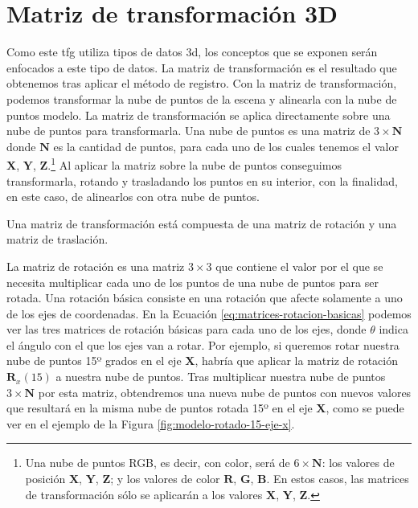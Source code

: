 \section{Matriz de transformación 3D}

Como este \gls{tfg} utiliza tipos de datos \gls{3d}, los conceptos que se exponen serán enfocados a este tipo de datos.
La matriz de transformación \citep{wiki:transformation-matrix} es el resultado que obtenemos tras aplicar el método de registro.
Con la matriz de transformación, podemos transformar la nube de puntos de la escena y alinearla con la nube de puntos modelo.
La matriz de transformación se aplica directamente sobre una nube de puntos para transformarla.
Una nube de puntos es una matriz de $3\times\mathbf{N}$ donde $\mathbf{N}$ es la cantidad de puntos, para cada uno de los cuales tenemos el valor $\mathbf{X}$, $\mathbf{Y}$, $\mathbf{Z}$.\footnote{Una nube de puntos RGB, es decir, con color, será de $6\times\mathbf{N}$: los valores de posición $\mathbf{X}$, $\mathbf{Y}$, $\mathbf{Z}$; y los valores de color $\mathbf{R}$, $\mathbf{G}$, $\mathbf{B}$.
En estos casos, las matrices de transformación sólo se aplicarán a los valores $\mathbf{X}$, $\mathbf{Y}$, $\mathbf{Z}$.}
Al aplicar la matriz sobre la nube de puntos conseguimos transformarla, rotando y trasladando los puntos en su interior, con la finalidad, en este caso, de alinearlos con otra nube de puntos.

Una matriz de transformación está compuesta de una matriz de rotación y una matriz de traslación.

La matriz de rotación \citep{wiki:rotation-matrix} es una matriz $3\times3$ que contiene el valor por el que se necesita multiplicar cada uno de los puntos de una nube de puntos para ser rotada.
Una rotación básica consiste en una rotación que afecte solamente a uno de los ejes de coordenadas.
En la Ecuación \ref{eq:matrices-rotacion-basicas} podemos ver las tres matrices de rotación básicas para cada uno de los ejes, donde $\theta$ indica el ángulo con el que los ejes van a rotar.
Por ejemplo, si queremos rotar nuestra nube de puntos 15º grados en el eje $\mathbf{X}$, habría que aplicar la matriz de rotación $\mathbf{R}_{x}(15)$ a nuestra nube de puntos.
Tras multiplicar nuestra nube de puntos $3\times\mathbf{N}$ por esta matriz, obtendremos una nueva nube de puntos con nuevos valores que resultará en la misma nube de puntos rotada 15º en el eje $\mathbf{X}$, como se puede ver en el ejemplo de la Figura \ref{fig:modelo-rotado-15-eje-x}.

